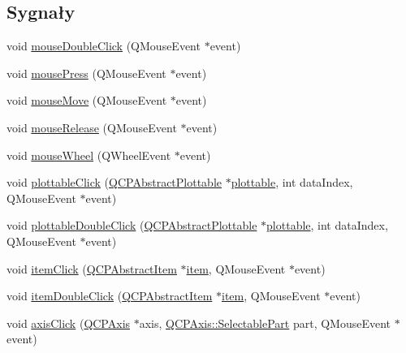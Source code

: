 \subsection*{Sygnały}
\begin{DoxyCompactItemize}
\item 
void \hyperlink{class_q_custom_plot_a9b232142c64fcf273a953ee08e5b90e9}{mouse\+Double\+Click} (Q\+Mouse\+Event $\ast$event)
\item 
void \hyperlink{class_q_custom_plot_aca75bf9afb5dd19349c375de2a87a051}{mouse\+Press} (Q\+Mouse\+Event $\ast$event)
\item 
void \hyperlink{class_q_custom_plot_a742ca4f94688bed2a685fd8a56ce5704}{mouse\+Move} (Q\+Mouse\+Event $\ast$event)
\item 
void \hyperlink{class_q_custom_plot_ac8dc0ee6bb98e923c00b4ebafbe6134d}{mouse\+Release} (Q\+Mouse\+Event $\ast$event)
\item 
void \hyperlink{class_q_custom_plot_ac80a14206f99304a91d2aa55775ec3ff}{mouse\+Wheel} (Q\+Wheel\+Event $\ast$event)
\item 
void \hyperlink{class_q_custom_plot_af5fe78b8bc9e4e96df921612837fd4fd}{plottable\+Click} (\hyperlink{class_q_c_p_abstract_plottable}{Q\+C\+P\+Abstract\+Plottable} $\ast$\hyperlink{class_q_custom_plot_a32de81ff53e263e785b83b52ecd99d6f}{plottable}, int data\+Index, Q\+Mouse\+Event $\ast$event)
\item 
void \hyperlink{class_q_custom_plot_a86a3ab7263c9c4e008e70d6c5fce9fbd}{plottable\+Double\+Click} (\hyperlink{class_q_c_p_abstract_plottable}{Q\+C\+P\+Abstract\+Plottable} $\ast$\hyperlink{class_q_custom_plot_a32de81ff53e263e785b83b52ecd99d6f}{plottable}, int data\+Index, Q\+Mouse\+Event $\ast$event)
\item 
void \hyperlink{class_q_custom_plot_ae16b51f52d2b7aebbc7e3e74e6ff2e4b}{item\+Click} (\hyperlink{class_q_c_p_abstract_item}{Q\+C\+P\+Abstract\+Item} $\ast$\hyperlink{class_q_custom_plot_a3e842b5a65b1d17fbb96cfb1fa1314d1}{item}, Q\+Mouse\+Event $\ast$event)
\item 
void \hyperlink{class_q_custom_plot_ac83aa9f5a3e9bb3efc9cdc763dcd42a6}{item\+Double\+Click} (\hyperlink{class_q_c_p_abstract_item}{Q\+C\+P\+Abstract\+Item} $\ast$\hyperlink{class_q_custom_plot_a3e842b5a65b1d17fbb96cfb1fa1314d1}{item}, Q\+Mouse\+Event $\ast$event)
\item 
void \hyperlink{class_q_custom_plot_abf635f8b56ab5c16d5de9f358543e82b}{axis\+Click} (\hyperlink{class_q_c_p_axis}{Q\+C\+P\+Axis} $\ast$axis, \hyperlink{class_q_c_p_axis_abee4c7a54c468b1385dfce2c898b115f}{Q\+C\+P\+Axis\+::\+Selectable\+Part} part, Q\+Mouse\+Event $\ast$event)

\end{DoxyCompactItemize}
